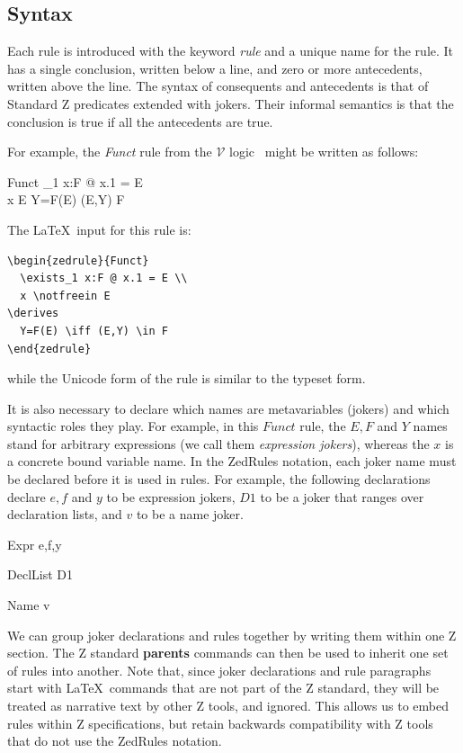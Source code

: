 \documentclass{entcs}
\newcommand{\V}{\mathcal{V}}
\begin{document}
\subsection{Syntax}

Each rule is introduced with the keyword \emph{rule} and a unique name
for the rule.  It has a single conclusion, written below a line, and
zero or more antecedents, written above the line.  The syntax of
consequents and antecedents is that of Standard Z predicates extended
with jokers.  Their informal semantics is that the conclusion is true
if all the antecedents are true.

For example, the \emph{Funct} rule from the $\V$
logic~\cite{brien:calculus-schemas-z00} might be written as follows:
\begin{zedrule}{Funct}
  \exists_1 x:F @ x.1 = E \\
  \proviso x \notfreein E
\derives
  Y=F(E) \iff (E,Y) \in F
\end{zedrule}

The \LaTeX\ input for this rule is:
\begin{verbatim}
\begin{zedrule}{Funct}
  \exists_1 x:F @ x.1 = E \\
  x \notfreein E
\derives
  Y=F(E) \iff (E,Y) \in F
\end{zedrule}
\end{verbatim}
while the Unicode form of the rule is similar to the typeset form.

It is also necessary to declare which names are metavariables
(jokers) and which syntactic roles they play.  For example, in
this $Funct$ rule, the $E,F$ and $Y$ names stand for arbitrary
expressions (we call them \emph{expression jokers}), whereas the $x$
is a concrete bound variable name.  In the ZedRules notation, each
joker name must be declared before it is used in rules.  For example,
the following declarations declare $e,f$ and $y$ to be expression
jokers, $D1$ to be a joker that ranges over declaration lists, and
$v$ to be a name joker.

\begin{zedjoker}{Expr} e,f,y \end{zedjoker}
\begin{zedjoker}{DeclList} D1 \end{zedjoker}
\begin{zedjoker}{Name} v \end{zedjoker}

We can group joker declarations and rules together by writing them
within one Z section.  The Z standard \textbf{parents} commands can
then be used to inherit one set of rules into another.  Note that,
since joker declarations and rule paragraphs start with \LaTeX\
commands that are not part of the Z standard, they will be treated as
narrative text by other Z tools, and ignored.  This allows us to embed
rules within Z specifications, but retain backwards compatibility with
Z tools that do not use the ZedRules notation.
\end{document}
